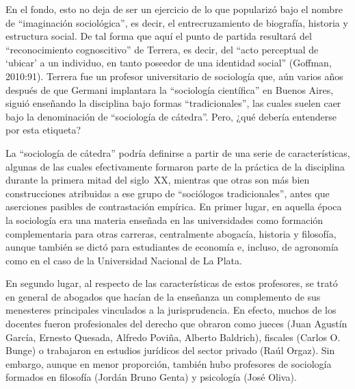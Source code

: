 En el fondo, esto no deja de ser un ejercicio de lo que \textcite{1451-WRIGHTMILLS1956} popularizó bajo el nombre de \enquote{imaginación sociológica}, es decir, el entrecruzamiento de biografía, historia y estructura social. De tal forma que aquí el punto de partida resultará del \enquote{reconocimiento cognoscitivo} de Terrera, es decir, del \enquote{acto perceptual de \enquote{ubicar} a un individuo, en tanto poseedor de una identidad social} (Goffman, 2010:91). Terrera fue un profesor universitario de sociología que, aún varios años después de que Germani implantara la \enquote{sociología científica} en Buenos Aires, siguió enseñando la disciplina bajo formas \enquote{tradicionales}, las cuales suelen caer bajo la denominación de \enquote{sociología de cátedra}. Pero, ¿qué debería entenderse por esta etiqueta?

La \enquote{sociología de cátedra} podría definirse a partir de una serie de características, algunas de las cuales efectivamente formaron parte de la práctica de la disciplina durante la primera mitad del siglo~XX, mientras que otras son más bien construcciones atribuidas a ese grupo de \enquote{sociólogos tradicionales}, antes que aserciones pasibles de contrastación empírica. En primer lugar, en aquella época la sociología era una materia enseñada en las universidades como formación complementaria para otras carreras, centralmente abogacía, historia y filosofía, aunque también se dictó para estudiantes de economía e, incluso, de agronomía como en el caso de la Universidad Nacional de La Plata.

En segundo lugar, al respecto de las características de estos profesores, se trató en general de abogados que hacían de la enseñanza un complemento de sus menesteres principales vinculados a la jurisprudencia. En efecto, muchos de los docentes fueron profesionales del derecho que obraron como jueces (Juan Agustín García, Ernesto Quesada, Alfredo Poviña, Alberto Baldrich), fiscales (Carlos O. Bunge) o trabajaron en estudios jurídicos del sector privado (Raúl Orgaz). Sin embargo, aunque en menor proporción, también hubo profesores de sociología formados en filosofía (Jordán Bruno Genta) y psicología (José Oliva).

